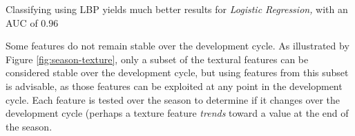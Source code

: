 \documentclass[letterpaper]{article}
\begin{document}
{%
%
%


Classifying using LBP yields much better results for \textit{Logistic Regression,} with an AUC of $0.96$
\begin{tiny}
\renewcommand{\arraystretch}{1.2}

\end{tiny}

Some features do not remain stable over the development cycle. As illustrated by Figure \ref{fig:season-texture}, only a subset of the textural features can be considered stable over the development cycle, but using features from this subset is advisable, as those features can be exploited at any point in the development cycle.  Each feature is tested over the season to determine if it changes over the development cycle (perhaps a texture feature \textit{trends} toward a value at the end of the season.

}
\end{document}

